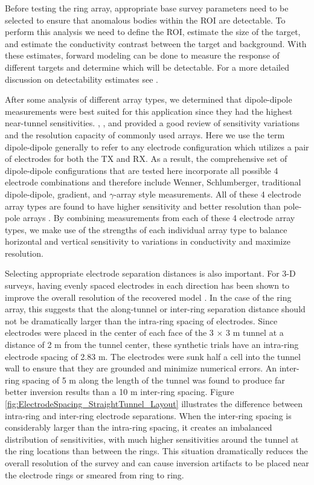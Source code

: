 \documentclass[preprint,authoryear,12pt]{elsarticle}
\begin{document}
Before testing the ring array, appropriate base survey parameters need to be selected to ensure that anomalous bodies within the ROI are detectable. To perform this analysis we need to define the ROI, estimate the size of the target, and estimate the conductivity contrast between the target and background. With these estimates, forward modeling can be done to measure the response of different targets and determine which will be detectable. For a more detailed discussion on detectability estimates see \citet{Mitchell2020}.

After some analysis of different array types, we determined that dipole-dipole measurements were best suited for this application since they had the highest near-tunnel sensitivities. \citet{Spitzer1998}, \citet{Dahlin2004}, and \citet{Okpoli2013} provided a good review of sensitivity variations and the resolution capacity of commonly used arrays. Here we use the term dipole-dipole generally to refer to any electrode configuration which utilizes a pair of electrodes for both the TX and RX. As a result, the comprehensive set of dipole-dipole configurations that are tested here incorporate all possible 4 electrode combinations and therefore include Wenner, Schlumberger, traditional dipole-dipole, gradient, and $\gamma$-array style measurements. All of these 4 electrode array types are found to have higher sensitivity and better resolution than pole-pole arrays \citep{Dahlin2004, Okpoli2013}. By combining measurements from each of these 4 electrode array types, we make use of the strengths of each individual array type to balance horizontal and vertical sensitivity to variations in conductivity and maximize resolution.

Selecting appropriate electrode separation distances is also important. For 3-D surveys, having evenly spaced electrodes in each direction has been shown to improve the overall resolution of the recovered model \citep{Okpoli2013}. In the case of the ring array, this suggests that the along-tunnel or inter-ring separation distance should not be dramatically larger than the intra-ring spacing of electrodes. Since electrodes were placed in the center of each face of the 3 $\times$ 3 m tunnel at a distance of 2 m from the tunnel center, these synthetic trials have an intra-ring electrode spacing of 2.83 m. The electrodes were sunk half a cell into the tunnel wall to ensure that they are grounded and minimize numerical errors. An inter-ring spacing of 5 m along the length of the tunnel was found to produce far better inversion results than a 10 m inter-ring spacing. Figure \ref{fig:ElectrodeSpacing_StraightTunnel_Layout} illustrates the difference between intra-ring and inter-ring electrode separations. When the inter-ring spacing is considerably larger than the intra-ring spacing, it creates an imbalanced distribution of sensitivities, with much higher sensitivities around the tunnel at the ring locations than between the rings. This situation dramatically reduces the overall resolution of the survey and can cause inversion artifacts to be placed near the electrode rings or smeared from ring to ring.
\end{document}
